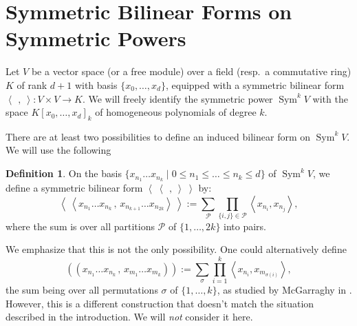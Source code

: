 \documentclass{amsart}
\DeclareMathOperator{\Sym}{Sym}
\newcommand{\coloneqq}{:=}
\newcommand{\bra}{\left<\!\!\!\:\left<}
\newcommand{\ket}{\right>\!\!\!\:\right>}
\theoremstyle{plain}
\theoremstyle{definition}
\newtheorem{definition}[theorem]{Definition}
\theoremstyle{remark}
\begin{document}
\section{Symmetric Bilinear Forms on Symmetric Powers} \label{symSection}
Let $V$ be a vector space (or a free module) over a field (resp.~a commutative ring) $K$ of rank $d+1$ with basis $\{x_0,\ldots,x_{d}\}$, equipped with a symmetric bilinear form $\left<\,\ ,\ \right>: V\times V \rightarrow K$. We will freely identify the symmetric power $\Sym^kV$ with the space $K[x_0,\ldots,x_d]_k$ of homogeneous polynomials of degree $k$. 

There are at least two possibilities to define an induced bilinear form on $\Sym^kV$. We will use the following
\begin{definition} \label{formdef} On the basis $\{x_{n_1}\ldots x_{n_k}\;|\;0\leq n_1\leq\ldots\leq n_k\leq d\}$ of $\Sym^kV$, we define a symmetric bilinear form $\bra\ \,,\ \ket$ by: 
\begin{equation}
\label{mydef}
\bra x_{n_1}\ldots x_{n_k}\,,\,x_{n_{k+1}}\ldots x_{n_{2k}} \ket \coloneqq \sum_{\mathcal{P}} \prod_{\{i,j\}\in\mathcal{P}} \left<x_{n_i},x_{n_j}\right>,
\end{equation}
where the sum is over all partitions $\mathcal{P}$ of $\{1,\ldots,2k\}$ into pairs.
\end{definition}

We emphasize that this is not the only possibility. One could alternatively define
\begin{equation}\label{Garr}
\left(\!\left( x_{n_1}\ldots x_{n_k}\,,\, x_{m_1}\ldots x_{m_k}\right)\!\right) \coloneqq \sum_\sigma  
\prod_{i=1}^k \left< x_{n_i},x_{m_{\sigma(i)}}\right>,
\end{equation}
the sum being over all permutations $\sigma$ of $\{1,\ldots,k\}$, as studied by McGarraghy in \cite{McGarr}. However, this is a different construction that doesn't match the situation described in the introduction. We will \emph{not} consider it here.
\end{document}
